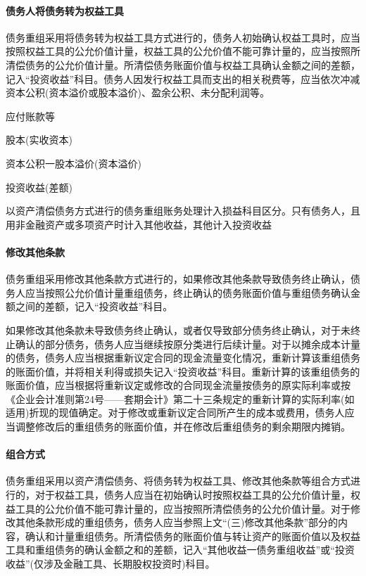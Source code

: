 \documentclass[UTF8,12pt]{ctexart}
\newenvironment{Dr}{%
	\begin{list}{}%
		{
			\setlength{\leftmargin}{2em}
			\setlength{\labelwidth}{2em}
			\setlength{\labelsep}{0pt}
			\setlength{\itemindent}{0pt}
			\setlength{\listparindent}{0pt}
			\setlength{\parsep}{0pt}
			\setlength{\topsep}{0pt}
		}
		\item[\textbf{借：}]
	}{%
	\end{list}
}
\newenvironment{Cr}{%
	\begin{list}{}%
		{
			\setlength{\leftmargin}{3em}
			\setlength{\labelwidth}{2em}
			\setlength{\labelsep}{0pt}
			\setlength{\itemindent}{0pt}
			\setlength{\listparindent}{0pt}
			\setlength{\parsep}{0pt}
			\setlength{\topsep}{0pt}
		}
		\item[\textbf{贷：}]
	}{%
	\end{list}
}
\numberwithin{equation}{section} %
\numberwithin{figure}{section}
\numberwithin{table}{section}
\begin{document}
	\paragraph{债务人将债务转为权益工具}
	债务重组采用将债务转为权益工具方式进行的，债务人初始确认权益工具时，应当按照权益工具的公允价值计量，权益工具的公允价值不能可靠计量的，应当按照所清偿债务的公允价值计量。所清偿债务账面价值与权益工具确认金额之间的差额，记入“投资收益”科目。债务人因发行权益工具而支出的相关税费等，应当依次冲减资本公积(资本溢价或股本溢价)、盈余公积、未分配利润等。
	\begin{Dr}
		应付账款等
	\end{Dr}
	\begin{Cr}
		股本(实收资本)
		
		资本公积一股本溢价(资本溢价)
		
		投资收益(差额)
	\end{Cr}
	
	以资产清偿债务方式进行的债务重组账务处理计入损益科目区分。只有债务人，且用非金融资产或多项资产时计入其他收益，其他计入投资收益
	
	\paragraph{修改其他条款}
	债务重组采用修改其他条款方式进行的，如果修改其他条款导致债务终止确认，债务人应当按照公允价值计量重组债务，终止确认的债务账面价值与重组债务确认金额之间的差额，记入“投资收益”科目。
	
	如果修改其他条款未导致债务终止确认，或者仅导致部分债务终止确认，对于未终止确认的部分债务，债务人应当继续按原分类进行后续计量。对于以摊余成本计量的债务，债务人应当根据重新议定合同的现金流量变化情况，重新计算该重组债务的账面价值，并将相关利得或损失记入“投资收益”科目。重新计算的该重组债务的账面价值，应当根据将重新议定或修改的合同现金流量按债务的原实际利率或按《企业会计准则第24号——套期会计》第二十三条规定的重新计算的实际利率(如适用)折现的现值确定。对于修改或重新议定合同所产生的成本或费用，债务人应当调整修改后的重组债务的账面价值，并在修改后重组债务的剩余期限内摊销。
	
	\paragraph{组合方式}
	债务重组采用以资产清偿债务、将债务转为权益工具、修改其他条款等组合方式进行的，对于权益工具，债务人应当在初始确认时按照权益工具的公允价值计量，权益工具的公允价值不能可靠计量的，应当按照所清偿债务的公允价值计量。对于修改其他条款形成的重组债务，债务人应当参照上文“(三)修改其他条款”部分的内容，确认和计量重组债务。所清偿债务的账面价值与转让资产的账面价值以及权益工具和重组债务的确认金额之和的差额，记入“其他收益一债务重组收益”或“投资收益”(仅涉及金融工具、长期股权投资时)科目。
	
\end{document}
